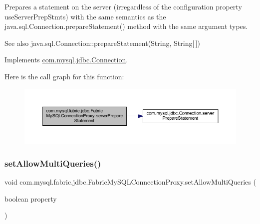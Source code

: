 Prepares a statement on the server (irregardless of the configuration property \textquotesingle{}use\+Server\+Prep\+Stmts\textquotesingle{}) with the same semantics as the java.\+sql.\+Connection.\+prepare\+Statement() method with the same argument types.

\begin{DoxySeeAlso}{See also}
java.\+sql.\+Connection\+::prepare\+Statement(\+String, String\mbox{[}$\,$\mbox{]}) 
\end{DoxySeeAlso}


Implements \mbox{\hyperlink{interfacecom_1_1mysql_1_1jdbc_1_1_connection_a7bbac014ef6bb3ad113c039f71af4bd9}{com.\+mysql.\+jdbc.\+Connection}}.

Here is the call graph for this function\+:\nopagebreak
\begin{figure}[H]
\begin{center}
\leavevmode
\includegraphics[width=350pt]{classcom_1_1mysql_1_1fabric_1_1jdbc_1_1_fabric_my_s_q_l_connection_proxy_a128a3b2a89feb4f14eabd24a9d7e7835_cgraph}
\end{center}
\end{figure}
\mbox{\label{classcom_1_1mysql_1_1fabric_1_1jdbc_1_1_fabric_my_s_q_l_connection_proxy_a8a173d9a56b4ff007f6d853cc53a840f}} 
\subsubsection{\texorpdfstring{set\+Allow\+Multi\+Queries()}{setAllowMultiQueries()}}
{\footnotesize\ttfamily void com.\+mysql.\+fabric.\+jdbc.\+Fabric\+My\+S\+Q\+L\+Connection\+Proxy.\+set\+Allow\+Multi\+Queries (\begin{DoxyParamCaption}\item[{boolean}]{property }\end{DoxyParamCaption})}


